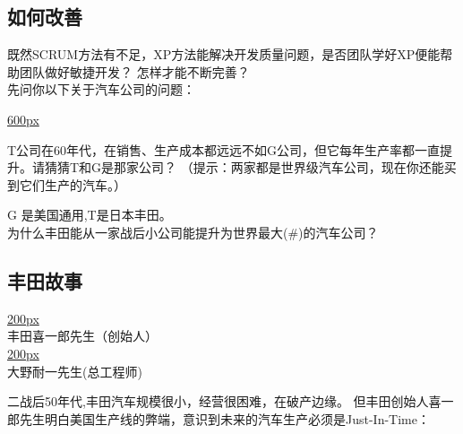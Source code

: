 \documentclass[]{article}
\providecommand{\tightlist}{%
  \setlength{\itemsep}{0pt}\setlength{\parskip}{0pt}}
\begin{document}
\hypertarget{ux5982ux4f55ux6539ux5584}{%
\subsection{如何改善}\label{ux5982ux4f55ux6539ux5584}}

既然SCRUM方法有不足，XP方法能解决开发质量问题，是否团队学好XP便能帮助团队做好敏捷开发？
怎样才能不断完善？\\
先问你以下关于汽车公司的问题：

\href{文件:TvsGcompScreenshot_2023-06-07_121806-1.jpg}{600px}

T公司在60年代，在销售、生产成本都远远不如G公司，但它每年生产率都一直提升。请猜猜T和G是那家公司？
（提示：两家都是世界级汽车公司，现在你还能买到它们生产的汽车。）

\begin{description}
\item[]
\begin{description}
\tightlist
\item[]
= = = = = = = = = = = =
\end{description}
\end{description}

G 是美国通用,T是日本丰田。\\
为什么丰田能从一家战后小公司能提升为世界最大(\#)的汽车公司？

\begin{description}
\item[]
\end{description}

\hypertarget{ux4e30ux7530ux6545ux4e8b}{%
\subsection{丰田故事}\label{ux4e30ux7530ux6545ux4e8b}}

\href{文件:ToyotaPresidentPicture1-1.jpg}{200px}\\
丰田喜一郎先生（创始人）\\
\href{文件:大野耐一-1.jpg}{200px}\\
大野耐一先生(总工程师)

二战后50年代,丰田汽车规模很小，经营很困难，在破产边缘。
但丰田创始人喜一郎先生明白美国生产线的弊端，意识到未来的汽车生产必须是Just-In-Time：
\end{document}
